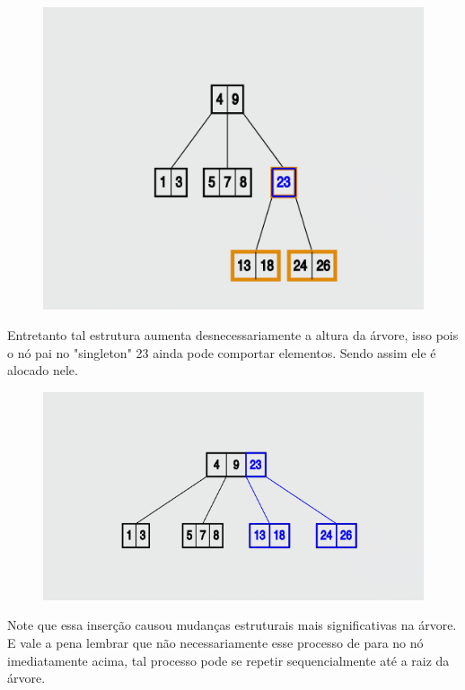 \begin{figure}[H]
	\centering
	\includegraphics[scale=0.5]{figures/insertion4.png}
\end{figure}

Entretanto tal estrutura aumenta desnecessariamente a altura da árvore, isso pois o nó pai no "singleton" 23 ainda pode comportar elementos. Sendo assim ele é alocado nele.

\begin{figure}[H]
	\centering
	\includegraphics[scale=0.5]{figures/insertion5.png}
\end{figure}

Note que essa inserção causou mudanças estruturais mais significativas na árvore. E vale a pena lembrar que não necessariamente esse processo de para no nó imediatamente acima, tal processo pode se repetir sequencialmente até a raiz da árvore.

